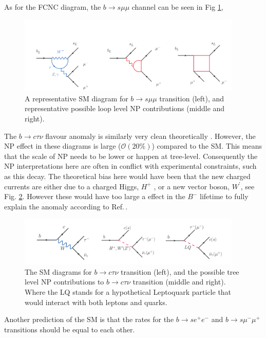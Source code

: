 \documentclass[10pt]{book}
\renewcommand{\(}{\left(}
\renewcommand{\)}{\right)}
\renewcommand{\[}{\left[}
\renewcommand{\]}{\right]}
\begin{document}
As for the FCNC diagram, the $b \rightarrow s \mu \mu$ channel can be seen in Fig \ref{fig:Flavour_D_2_Muon}, 
%
\begin{figure}[H]
	\centering
	\includegraphics[width=0.95\textwidth]{Stolen_2.png}
	\caption{A representative SM diagram for $b \rightarrow s \mu \mu$ transition (left), and representative possible loop level NP
contributions (middle and right).}
	\label{fig:Flavour_D_2_Muon}
\end{figure}
%
The $b \rightarrow c \tau \nu$ flavour anomaly is similarly very clean theoretically \cite{Fajfer_2012}. However, the NP effect in these diagrams is large ($\mathcal{O}(20\%)$) compared to the SM. This means that the scale of NP needs to be lower or happen at tree-level. Consequently the NP interpretations here are often in conflict with experimental constraints, such as this decay.
%
The theoretical bias here would have been that the new charged currents are either due to a charged Higgs, $H^+$ , or a new vector boson, $W^\prime$, see Fig. \ref{fig:Flavour_D_3_Tau}. However these would have too large a effect in the $B^-$ lifetime to fully explain the anomaly according to Ref.\,\cite{Alonso_2017}.
%
\begin{figure}[H]	
	\centering
	\includegraphics[width=0.95\textwidth]{Stolen_3.png}
	\caption{The SM diagrams for $b \rightarrow c \tau \nu$ transition (left), and the possible tree level NP contributions to $b \rightarrow c \tau \nu$ transition (middle and right). Where the LQ stands for a hypothetical Leptoquark particle that would interact with both leptons and quarks.}
	\label{fig:Flavour_D_3_Tau}
\end{figure}
%
Another prediction of the SM is that the rates for the  $b \rightarrow s e^+ e^-$ and  $b \rightarrow s \mu^- \mu^+$ transitions should be equal to each other.
\end{document}
